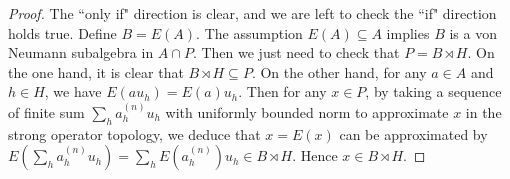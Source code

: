 \documentclass[10pt,a4paper]{amsart}
\begin{document}
\begin{proof}
The ``only if" direction is clear, and we are left to check the ``if" direction holds true. Define $B=E(A)$. The assumption $E(A)\subseteq A$ implies $B$ is a von Neumann subalgebra in $A\cap P$. Then we just need to check that $P=B\rtimes H$. On the one hand, it is clear that $B\rtimes H\subseteq P$. On the other hand, for any $a\in A$ and $h\in H$, we have $E(au_h)=E(a)u_h$. Then for any $x\in P$, by taking a sequence of finite sum $\sum_ha_h^{(n)}u_h$ with uniformly bounded norm to approximate $x$ in the strong operator topology, we deduce that $x=E(x)$ can be approximated by $E(\sum_ha_h^{(n)}u_h)=\sum_hE(a_h^{(n)})u_h\in B\rtimes H$. Hence $x\in B\rtimes H$. 
\end{proof}
\end{document}
